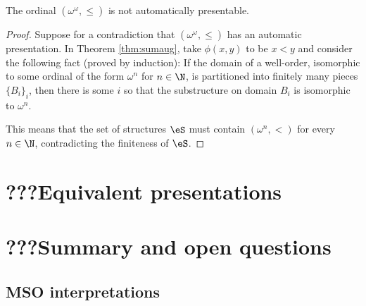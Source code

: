 \begin{corollary} {\rm \cite{Delh01a}} \label{cor:omegaomega}
The ordinal $(\omega^\omega,\leq)$ is not automatically presentable.
\end{corollary}

\begin{proof}
Suppose for a contradiction that $(\omega^\omega,\leq)$ has an automatic presentation.
In Theorem \ref{thm:sumaug}, take $\phi(x,y)$ to be $x < y$ and
consider the following fact (proved by induction): If the domain of a well-order,
isomorphic to some ordinal of the form $\omega^n$ for $n \in \N$, is
partitioned into finitely many pieces $\{B_i\}_i$, then there is some $i$ so
that the substructure on domain $B_i$ is isomorphic to $\omega^n$.

This means that the set of structures $\eS$ must contain $(\omega^n,<)$ for every $n \in \N$, contradicting
the finiteness of $\eS$.
\end{proof}

\begin{definition}
 
\end{definition}


\section{???Equivalent presentations}


\section{???Summary and open questions}




















\iffalse










\subsection{MSO interpretations}

